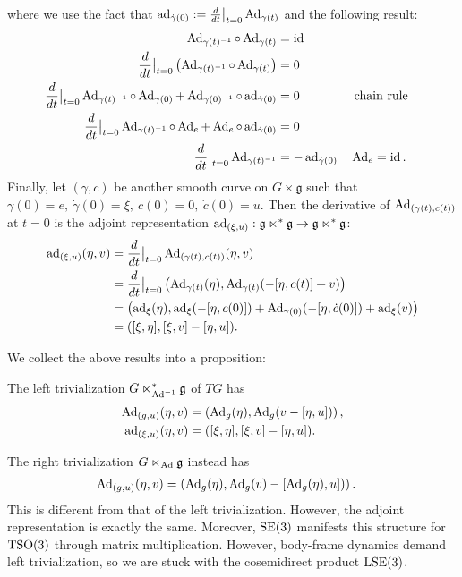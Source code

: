 \documentclass[12pt,class=article,crop=false]{standalone}
\begin{document}
where we use the fact that $ \operatorname{ad}_{ \dot{ \gamma}(0)} := \frac{d}{dt}\big|_{t= 0} \operatorname{Ad}_{ \gamma(t)}$ and the following result: 
\begin{align*}
\operatorname{Ad}_{ \gamma(t)^{-1}} \circ  \operatorname{Ad}_{ \gamma(t)} &= \operatorname{id}  \\
\frac{d}{dt}\big|_{t= 0} \left( \operatorname{Ad}_{ \gamma(t)^{-1}} \circ  \operatorname{Ad}_{ \gamma(t)} \right) &= 0 \\
\frac{d}{dt}\big|_{t= 0} \operatorname{Ad}_{ \gamma(t)^{-1}} \circ  \operatorname{Ad}_{ \gamma(0)} + \operatorname{Ad}_{ \gamma(0)^{-1}} \circ \operatorname{ad}_{ \dot{ \gamma}(0)} &= 0 && \text{ chain rule}\\
\frac{d}{dt}\big|_{t= 0} \operatorname{Ad}_{ \gamma(t)^{-1}} \circ \operatorname{Ad}_{ e} + \operatorname{Ad}_{ e} \circ \operatorname{ad}_{\dot{ \gamma}(0)} &= 0 \\
\frac{d}{dt}\big|_{t= 0} \operatorname{Ad}_{ \gamma(t)^{-1}} &= - \operatorname{ad}_{ \dot{ \gamma}(0)}  && \operatorname{Ad}_{ e} = \operatorname{id}  . 
\end{align*}
Finally, let $ (\gamma, c)$ be another smooth curve on $ G \times  \mathfrak{g}$ such that $ \gamma(0) = e,\ \dot{ \gamma}(0) = \xi,\ c(0) =0,\ \dot{c}(0) = u$. Then the derivative of $ \operatorname{Ad}_{ ( \gamma(t), c(t))}$ at $ t=0$ is the adjoint representation $ \operatorname{ad}_{ (\xi, u)}: \mathfrak{g} \ltimes^*  \mathfrak{g} \to \mathfrak{g} \ltimes^*  \mathfrak{g} $:
\begin{align*}
	\operatorname{ad}_{ (\xi,u)}(\eta, v) &= \frac{d}{dt}\big|_{t= 0} \operatorname{Ad}_{ ( \gamma(t), c(t))}( \eta,v ) \\
				&= \frac{d}{dt}\big|_{t= 0} \left( \operatorname{Ad}_{ \gamma(t)}( \eta), \operatorname{Ad}_{ \gamma(t)}( -[\eta, c(t)] + v) \right)    \\
				&= \left( \operatorname{ad}_{ \xi}(\eta), \operatorname{ad}_{ \xi} (-[\eta,c(0)]) + \operatorname{Ad}_{ \gamma(0)}( - [\eta, \dot{c}(0)] ) + \operatorname{ad}_{ \xi}(v) \right)   \\
				&= ([ \xi, \eta], [\xi, v] - [\eta, u]) .
\end{align*}

We collect the above results into a proposition:
\begin{prop}
The left trivialization $ G \ltimes_{\operatorname{Ad}^{-1}}^* \mathfrak{g} $ of $ TG$ has
 \begin{align*}
	\operatorname{Ad}_{ (g,u)}(\eta, v ) &= \left( \operatorname{Ad}_{ g}( \eta), \operatorname{Ad}_{ g}(v-[ \eta, u]) \right),\\
	\operatorname{ad}_{ (\xi,u)}(\eta, v) &=  ([ \xi, \eta], [\xi, v] - [\eta, u]). 
\end{align*}
\end{prop}
\begin{remark}
The right trivialization $ G \ltimes_{\operatorname{Ad}} \mathfrak{g} $ instead has
\begin{align*}
	\operatorname{Ad}_{ (g,u)}(\eta, v ) &= \left( \operatorname{Ad}_{ g}( \eta), \operatorname{Ad}_{ g}(v)-[ \operatorname{Ad}_{ g}( \eta), u]) \right).
\end{align*}
This is different from that of the left trivialization. However, the adjoint representation is exactly the same. Moreover, $ \operatorname{SE}(3)$ manifests this structure for $ \operatorname{TSO}(3)$ through matrix multiplication. However, body-frame dynamics demand left trivialization, so we are stuck with the cosemidirect product $ \operatorname{LSE}(3)$.
\end{remark}
\end{document}
